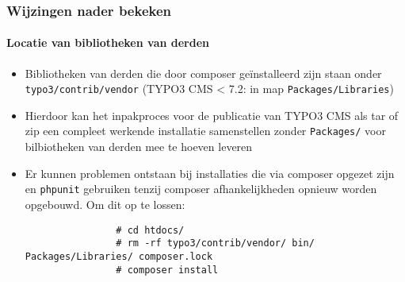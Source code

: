 \begin{frame}[fragile]
	\frametitle{Wijzingen nader bekeken}
	\framesubtitle{Locatie van bibliotheken van derden}

	\begin{itemize}

		\item Bibliotheken van derden die door composer geïnstalleerd zijn staan onder \texttt{typo3/contrib/vendor}\newline
			\small
				(TYPO3 CMS < 7.2: in map \texttt{Packages/Libraries})
			\normalsize

		\item Hierdoor kan het inpakproces voor de publicatie van TYPO3 CMS als tar of zip een
		 	compleet werkende installatie samenstellen zonder \texttt{Packages/} voor bilbiotheken van
		 	derden mee te hoeven leveren

		\item Er kunnen problemen ontstaan bij installaties die via composer opgezet zijn en \texttt{phpunit}
			gebruiken tenzij composer afhankelijkheden opnieuw worden opgebouwd. Om dit op te lossen:

			\begin{lstlisting}
				# cd htdocs/
				# rm -rf typo3/contrib/vendor/ bin/ Packages/Libraries/ composer.lock
				# composer install
			\end{lstlisting}
	\end{itemize}

\end{frame}

